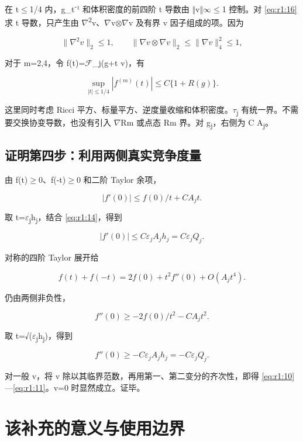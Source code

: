 \documentclass[UTF8,11pt,fontset=none]{ctexart}
\begin{document}
在 \textbar t\textbar\(\le\)1/4 内，g\_t\textsuperscript{-}¹ 和体积密度的前四阶 t 导数由 \(\Vert\)v\(\Vert\)\(\infty\)\(\le\)1 控制。对 \eqref{eq:r1:16} 求 t 导数，只产生由 \(\nabla\)\textsuperscript{2}v、\(\nabla\)v\(\otimes\)\(\nabla\)v 及有界 v 因子组成的项。因为

\[
\|\nabla^2v\|_2\le1,\qquad
\|\nabla v\otimes\nabla v\|_2\le\|\nabla v\|_4^2\le1,
\]

对于 m=2,4，令 f(t)=\(\mathscr F\)\_j(g+t v)，有

\[
\sup_{|t|\le1/4}|f^{(m)}(t)|
\le C\{1+R(g)\}.
\tag{1.17}\label{eq:r1:17}
\]

这里同时考虑 Ricci 平方、标量平方、逆度量收缩和体积密度。\textbar \(\tau\)\textsubscript{j}\textbar{} 有统一界。不需要交换协变导数，也没有引入 \(\nabla\)Rm 或点态 Rm 界。对 g\textsubscript{j}，右侧为 C A\textsubscript{j}。

\subsection{证明第四步：利用两侧真实竞争度量}\label{ch1:ux8bc1ux660eux7b2cux56dbux6b65ux5229ux7528ux4e24ux4fa7ux771fux5b9eux7adeux4e89ux5ea6ux91cf}

由 f(t)\(\ge\)0、f(-t)\(\ge\)0 和二阶 Taylor 余项，

\[
|f'(0)|\le f(0)/t+C A_j t.
\]

取 t=\(\varepsilon\)\textsubscript{j}h\textsubscript{j}，结合 \eqref{eq:r1:14}，得到

\[
|f'(0)|\le C\varepsilon_jA_jh_j=C\varepsilon_jQ_j.
\]

对称的四阶 Taylor 展开给

\[
f(t)+f(-t)=2f(0)+t^2f''(0)+O(A_jt^4).
\]

仍由两侧非负性，

\[
f''(0)\ge-2f(0)/t^2-C A_j t^2.
\]

取 t=√(\(\varepsilon\)\textsubscript{j}h\textsubscript{j})，得到

\[
f''(0)\ge-C\varepsilon_jA_jh_j=-C\varepsilon_jQ_j.
\]

对一般 v，将 v 除以其临界范数，再用第一、第二变分的齐次性，即得 \eqref{eq:r1:10}---\eqref{eq:r1:11}。v=0 时显然成立。证毕。

\section{该补充的意义与使用边界}\label{ch1:ux8be5ux8865ux5145ux7684ux610fux4e49ux4e0eux4f7fux7528ux8fb9ux754c}
\end{document}
